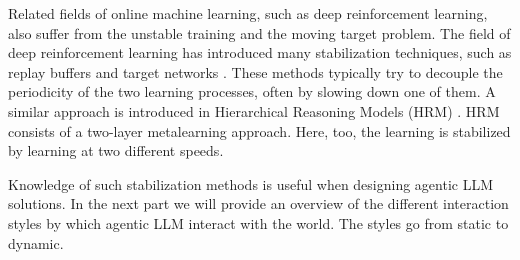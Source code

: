 

Related fields of online machine learning, such as deep reinforcement learning, also suffer from the unstable training and the moving target problem. 
The field of deep reinforcement learning has introduced many stabilization techniques, such as replay buffers and target networks \citep{mnih2015human,hessel2018rainbow}. These methods typically try to decouple the periodicity of the two learning processes, often by slowing down one of them. 
A similar approach is introduced in Hierarchical Reasoning Models (HRM) \citep{wang2025hierarchical}. HRM consists of a two-layer metalearning approach. Here, too, the learning is stabilized by learning at two different speeds. 

Knowledge of such stabilization  methods is useful when designing agentic LLM solutions. In the next part we will  provide an overview of the different interaction styles by which agentic LLM interact with the world. The styles go from static to dynamic.









